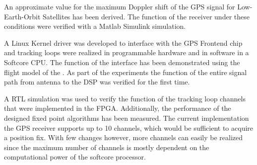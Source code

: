 An approximate value for the maximum Doppler shift of the GPS signal for Low-Earth-Orbit Satellites has been derived. The function of the receiver under these conditions were verified with a Matlab Simulink simulation.

A Linux Kernel driver was developed to interface with the GPS Frontend chip and tracking loops were realized in programmable hardware and in software in a Softcore CPU. The function of the interface has been demonstrated using the flight model of the \dscubesat. As part of the experiments the function of the entire signal path from antenna to the DSP was verified for the first time.

A \gls{RTL} simulation was used to verify the function of the tracking loop channels that were implemented in the FPGA. Additionally, the performance of the designed fixed point algorithms has been measured. The current implementation the GPS receiver supports up to 10 channels, which would be sufficient to acquire a position fix. With few changes however, more channels can easily be realized since the maximum number of channels is mostly dependent on the computational power of the softcore processor.
